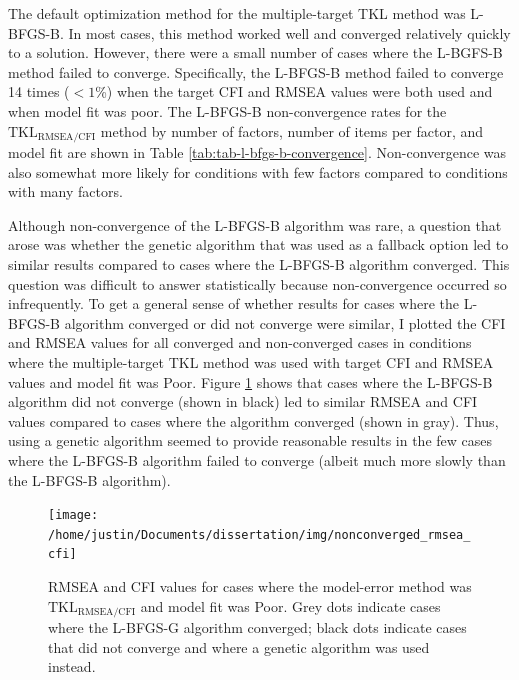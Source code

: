\documentclass[11pt]{umnthesis}
\begin{document}
The default optimization method for the multiple-target TKL method was L-BFGS-B. In most cases, this method worked well and converged relatively quickly to a solution. However, there were a small number of cases where the L-BGFS-B method failed to converge. Specifically, the L-BFGS-B method failed to converge 14 times (\(<1\)\%) when the target CFI and RMSEA values were both used and when model fit was poor. The L-BFGS-B non-convergence rates for the \(\textrm{TKL}_{\textrm{RMSEA/CFI}}\) method by number of factors, number of items per factor, and model fit are shown in Table \ref{tab:tab-l-bfgs-b-convergence}. Non-convergence was also somewhat more likely for conditions with few factors compared to conditions with many factors.

Although non-convergence of the L-BFGS-B algorithm was rare, a question that arose was whether the genetic algorithm that was used as a fallback option led to similar results compared to cases where the L-BFGS-B algorithm converged. This question was difficult to answer statistically because non-convergence occurred so infrequently. To get a general sense of whether results for cases where the L-BFGS-B algorithm converged or did not converge were similar, I plotted the CFI and RMSEA values for all converged and non-converged cases in conditions where the multiple-target TKL method was used with target CFI and RMSEA values and model fit was Poor. Figure \ref{fig:comparison-of-converged-vs-non-converged} shows that cases where the L-BFGS-B algorithm did not converge (shown in black) led to similar RMSEA and CFI values compared to cases where the algorithm converged (shown in gray). Thus, using a genetic algorithm seemed to provide reasonable results in the few cases where the L-BFGS-B algorithm failed to converge (albeit much more slowly than the L-BFGS-B algorithm).

\begin{figure}

{\centering \texttt{[image: /home/justin/Documents/dissertation/img/nonconverged\_rmsea\_cfi]} 

}

\caption[RMSEA and CFI values for cases where the model-error method was $\textrm{TKL}_{\textrm{RMSEA/CFI}}$ and model fit was Poor]{RMSEA and CFI values for cases where the model-error method was $\textrm{TKL}_{\textrm{RMSEA/CFI}}$ and model fit was Poor. Grey dots indicate cases where the L-BFGS-G algorithm converged; black dots indicate cases that did not converge and where a genetic algorithm was used instead.}\label{fig:comparison-of-converged-vs-non-converged}
\end{figure}
\end{document}
